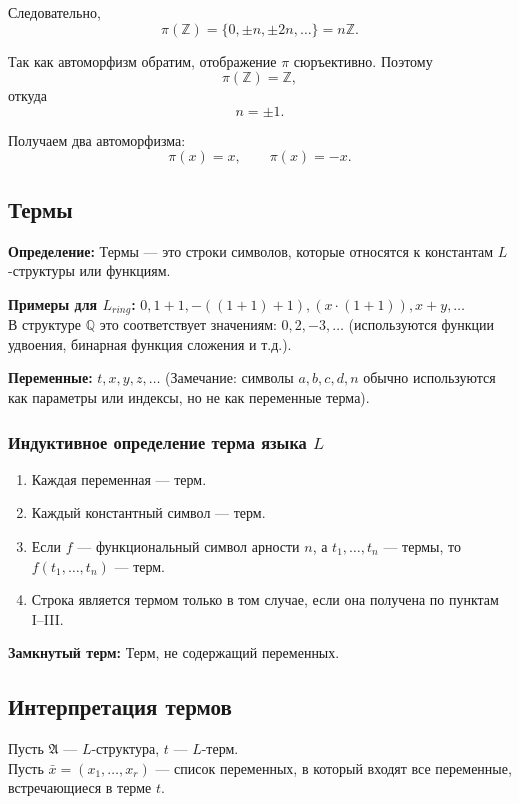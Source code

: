 \documentclass[12pt,a4paper,oneside,openany]{book}
\theoremstyle{definition}
\theoremstyle{plain}
\theoremstyle{remark}
\begin{document}
Следовательно,
\[
\pi(\mathbb{Z})
=
\{0,\pm n,\pm 2n,\ldots\}
=
n\mathbb{Z}.
\]

Так как автоморфизм обратим, отображение $\pi$ сюръективно. Поэтому
\[
\pi(\mathbb{Z})=\mathbb{Z},
\]
откуда
\[
n=\pm1.
\]

Получаем два автоморфизма:
\[
\pi(x)=x,
\qquad
\pi(x)=-x.
\]

\subsection{Термы}

\textbf{Определение:} Термы — это строки символов, которые относятся к константам $L$-структуры или функциям.

\textbf{Примеры для $L_{ring}$:} 
$0, 1+1, -((1+1)+1), (x \cdot (1+1)), x+y, \dots$ \\
В структуре $\mathbb{Q}$ это соответствует значениям: $0, 2, -3, \dots$ (используются функции удвоения, бинарная функция сложения и т.д.).

\textbf{Переменные:} $t, x, y, z, \dots$ 
(Замечание: символы $a, b, c, d, n$ обычно используются как параметры или индексы, но не как переменные терма).

\subsubsection{Индуктивное определение терма языка $L$}
\begin{enumerate}
    \item[I.] Каждая переменная — терм.
    \item[II.] Каждый константный символ — терм.
    \item[III.] Если $f$ — функциональный символ арности $n$, а $t_1, \dots, t_n$ — термы, то $f(t_1, \dots, t_n)$ — терм.
    \item[IV.] Строка является термом только в том случае, если она получена по пунктам I–III.
\end{enumerate}

\textbf{Замкнутый терм:} Терм, не содержащий переменных.

\subsection{Интерпретация термов}

Пусть $\mathfrak{A}$ — $L$-структура, $t$ — $L$-терм. \\
Пусть $\bar{x} = (x_1, \dots, x_r)$ — список переменных, в который входят все переменные, встречающиеся в терме $t$.
\end{document}
